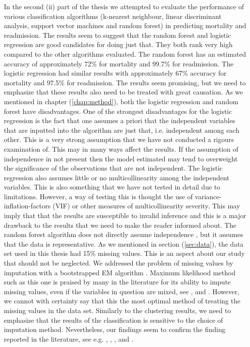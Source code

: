 \documentclass[../thesis.tex]{subfiles}
\begin{document}
\indent In the second (ii) part of the thesis we attempted to evaluate the performance of various classification algorithms (k-nearest neighbour, linear discriminant analysis, support vector machines and random forest) in predicting mortality and readmission. The results seem to suggest that the random forest and logistic regression are good candidates for doing just that. They both rank very high compared to the other algorithms evaluated. The random forest has an estimated accuracy of approximately 72\% for mortality and 99.7\% for readmission. The logistic regression had similar results with approximately 67\% accuracy for mortality and 97.5\% for readmission. The results seem promising, but we need to emphasize that these results also need to be treated with great causation. As we mentioned in chapter (\ref{chap:method}), both the logistic regression and random forest have disadvantages. One of the strongest disadvantages for the logistic regression is the fact that one assumes a priori that the independent variables that are inputted into the algorithm are just that, i.e. independent among each other. This is a very strong assumption that we have not conducted a rigours examination of. This may in many ways affect the results. If the assumption of independence in not present then the model estimated may tend to overweight the significance of the observations that are not independent. The logistic regression also assumes little or no multicollinearity among the independent variables. This is also something that we have not tested in detail due to limitations. However, a way of testing this is thought the use of variance-inflation-factors (VIF) or other measures of multicollinearity severity. This may imply that that the results are susceptible to invalid inference and this is a major drawback to the results that we need to make the reader informed about. The random forest algorithm does not directly assume independence \citep{friedman2009elements}, but it assumes that the data is representative. As we mentioned in section (\ref{sec:data}), the data set used in this thesis had 15\% missing values. This is an aspect about our study that should not be neglected. We addressed the problem of missing values by imputation with a bootstrapped EM algorithm \citep{honaker2011amelia}. Maximum likelihood method such as this one is praised by many in the literature for its ability to impute missing values, even if the variables in question are mixed, see \cite{schafer1997analysis}, \cite{schafer1998multiple} and \cite{allison1999missing}. However, we cannot with certainty say that this the most optimal method of treating the missing values in the data set. Similarly to the clustering results, we need to emphasize that the results of the classification is sensitive to the choice of imputation method. Nevertheless, our findings seem to confirm the finding reported in the literature, see e.g. \cite{austin2012regression}, \cite{zolfaghar2013big}, \cite{shah2014phenomapping}, \cite{panahiazar2015using} and \cite{koulaouzidis2016telemonitoring}.\\
\end{document}

